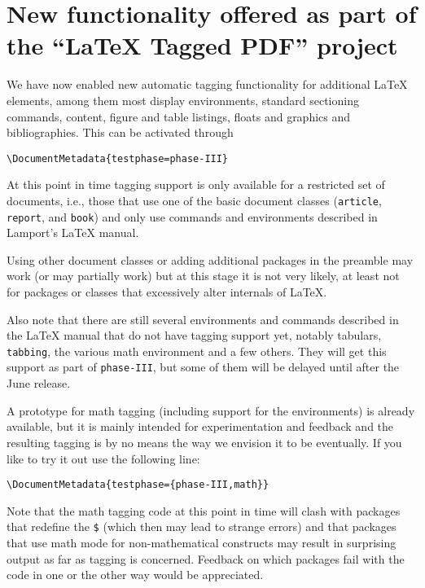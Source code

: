 \documentclass{ltnews}
\providecommand\tubcommand[1]{}
\begin{document}
\tubcommand{\addtolength\textheight{4.2pc}}   %

\maketitle
{  \spaceskip=3.33pt 
\tableofcontents}

\setlength{}


\medskip





\section{New functionality offered as part of the
  \enquote{\LaTeX{} Tagged PDF} project}

We have now enabled new automatic tagging functionality for additional
\LaTeX{} elements, among them most display environments, standard
sectioning commands, content, figure and table listings, floats and graphics and
bibliographies. This can
be activated through
\begin{verbatim}
\DocumentMetadata{testphase=phase-III}
\end{verbatim}
At this point in time tagging support is only available for a
restricted set of documents, i.e., those that use one of the basic
document classes (\texttt{article}, \texttt{report}, and
\texttt{book}) and only use commands and environments described in
Lamport's \LaTeX{} manual.

Using other document classes or adding additional packages in the
preamble may work (or may partially work) but at this stage it is not
very likely, at least not for packages or classes that excessively
alter internals of \LaTeX{}.

Also note that there are still several environments and commands
described in the \LaTeX{} manual that do not have tagging support yet,
notably tabulars, \texttt{tabbing}, the various math environment and a
few others.  They will get this support as part of \texttt{phase-III},
but some of them will be delayed until after the June release.

A prototype for math tagging (including support for the 
environments) is already available, but it is mainly intended for
experimentation and feedback and the resulting tagging is by no means
the way we envision it to be eventually. If you like to try it out use
the following line:
\begin{verbatim}
\DocumentMetadata{testphase={phase-III,math}}
\end{verbatim}
Note that the math tagging code at this point in time will clash with
packages that redefine the \texttt{\$} (which then may lead to strange
errors) and that packages that use math mode for non-mathematical
constructs may result in surprising output as far as tagging is
concerned. Feedback on which packages fail with the code in one or the
other way would be appreciated.
\end{document}
